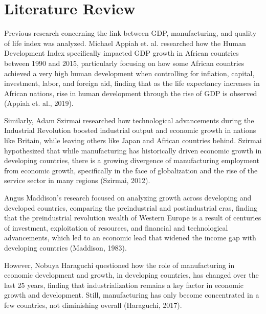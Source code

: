 \documentclass[12pt]{article}
\begin{document}
\section{Literature Review} \label{sec:literature}



Previous research concerning the link between GDP, manufacturing, and quality of life index was analyzed. Michael Appiah et. al. researched how the Human Development Index specifically impacted GDP growth in African countries between 1990 and 2015, particularly focusing on how some African countries achieved a very high human development when controlling for inflation, capital, investment, labor, and foreign aid, finding that as the life expectancy increases in African nations, rise in human development through the rise of GDP is observed (Appiah et. al., 2019). 

Similarly, Adam Szirmai researched how technological advancements during the Industrial Revolution boosted industrial output and economic growth in nations like Britain, while leaving others like Japan and African countries behind. Szirmai hypothesized that while manufacturing has historically driven economic growth in developing countries, there is a growing divergence of manufacturing employment from economic growth, specifically in the face of globalization and the rise of the service sector in many regions (Szirmai, 2012). 

Angus Maddison's research focused on analyzing growth across developing and developed countries, comparing the preindustrial and postindustrial eras, finding that the preindustrial revolution wealth of Western Europe is a result of centuries of investment, exploitation of resources, and financial and technological advancements, which led to an economic lead that widened the income gap with developing countries (Maddison, 1983). 

However, Nobuya Haraguchi questioned how the role of manufacturing in economic development and growth, in developing countries, has changed over the last 25 years, finding that industrialization remains a key factor in economic growth and development. Still, manufacturing has only become concentrated in a few countries, not diminishing overall (Haraguchi, 2017). 
\end{document}
